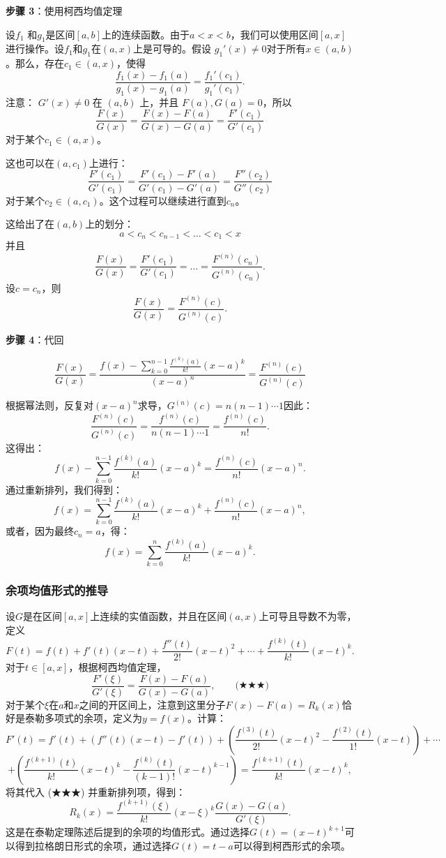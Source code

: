 \textbf{步骤 3}：使用柯西均值定理

设\( f_1 \) 和\( g_1 \)是区间\( [a, b] \)上的连续函数。由于\( a < x < b \)，我们可以使用区间\( [a, x] \) 进行操作。设\( f_1 \)和\( g_1 \)在\( (a, x) \)上是可导的。假设 \( g_1'(x) \neq 0 \)对于所有\( x \in (a, b) \)。那么，存在\( c_1 \in (a, x) \)，使得
\[
\frac{f_1(x) - f_1(a)}{g_1(x) - g_1(a)} = \frac{f_1'(c_1)}{g_1'(c_1)}.~
\]
注意： 
\( G'(x) \neq 0 \) 在 \( (a, b) \) 上，并且 \( F(a), G(a) = 0 \)，所以
\[
\frac{F(x)}{G(x)} = \frac{F(x) - F(a)}{G(x) - G(a)} = \frac{F'(c_1)}{G'(c_1)}~
\]
对于某个\( c_1 \in (a, x) \)。

这也可以在\( (a, c_1) \)上进行：
\[
\frac{F'(c_1)}{G'(c_1)} = \frac{F'(c_1) - F'(a)}{G'(c_1) - G'(a)} = \frac{F''(c_2)}{G''(c_2)}~
\]
对于某个\( c_2 \in (a, c_1) \)。这个过程可以继续进行直到\( c_n \)。

这给出了在\( (a, b) \)上的划分：
\[
a < c_n < c_{n-1} < \dots < c_1 < x~
\]
并且
\[
\frac{F(x)}{G(x)} = \frac{F'(c_1)}{G'(c_1)} = \dots = \frac{F^{(n)}(c_n)}{G^{(n)}(c_n)}.~
\]
设\( c = c_n \)，则
\[
\frac{F(x)}{G(x)} = \frac{F^{(n)}(c)}{G^{(n)}(c)}.~
\]

\textbf{步骤 4}：代回

\[
\frac{F(x)}{G(x)} = \frac{f(x) - \sum_{k=0}^{n-1} \frac{f^{(k)}(a)}{k!} (x - a)^k}{(x - a)^n} = \frac{F^{(n)}(c)}{G^{(n)}(c)}~
\]

根据幂法则，反复对\( (x - a)^n \)求导，\(G^{(n)}(c) = n(n - 1) \cdots 1\)因此：
\[
\frac{F^{(n)}(c)}{G^{(n)}(c)} = \frac{f^{(n)}(c)}{n(n - 1) \cdots 1} = \frac{f^{(n)}(c)}{n!}.~
\]
这得出：
\[
f(x) - \sum_{k=0}^{n-1} \frac{f^{(k)}(a)}{k!} (x - a)^k = \frac{f^{(n)}(c)}{n!} (x - a)^n.~
\]
通过重新排列，我们得到：
\[
f(x) = \sum_{k=0}^{n-1} \frac{f^{(k)}(a)}{k!} (x - a)^k + \frac{f^{(n)}(c)}{n!} (x - a)^n,~
\]
或者，因为最终\( c_n = a \)，得：
\[
f(x) = \sum_{k=0}^{n} \frac{f^{(k)}(a)}{k!} (x - a)^k.~
\]
\subsubsection{余项均值形式的推导}  
设\( G \)是在区间\( [a, x] \)上连续的实值函数，并且在区间\( (a, x) \)上可导且导数不为零，定义
\[
F(t) = f(t) + f'(t)(x - t) + \frac{f''(t)}{2!}(x - t)^2 + \cdots + \frac{f^{(k)}(t)}{k!}(x - t)^k.~
\]
对于\( t \in [a, x] \)，根据柯西均值定理，
\[
\frac{F'(\xi)}{G'(\xi)} = \frac{F(x) - F(a)}{G(x) - G(a)},\qquad \text{(★★★)}~
\]
对于某个\( \xi \)在\( a \)和\( x \)之间的开区间上，注意到这里分子\( F(x) - F(a) = R_k(x) \)恰好是泰勒多项式的余项，定义为\( y = f(x) \)。计算：
\[
F'(t) = f'(t) + \left( f''(t)(x - t) - f'(t) \right) + \left( \frac{f^{(3)}(t)}{2!} (x - t)^2 - \frac{f^{(2)}(t)}{1!} (x - t) \right) + \cdots ~
\]
\[
+ \left( \frac{f^{(k+1)}(t)}{k!} (x - t)^k - \frac{f^{(k)}(t)}{(k-1)!} (x - t)^{k-1} \right) = \frac{f^{(k+1)}(t)}{k!} (x - t)^k,~
\]
将其代入 (★★★) 并重新排列项，得到：
\[
R_k(x) = \frac{f^{(k+1)}(\xi)}{k!} (x - \xi)^k \frac{G(x) - G(a)}{G'(\xi)}.~
\]
这是在泰勒定理陈述后提到的余项的均值形式。通过选择\( G(t) = (x - t)^{k+1} \)可以得到拉格朗日形式的余项，通过选择\( G(t) = t - a \)可以得到柯西形式的余项。

